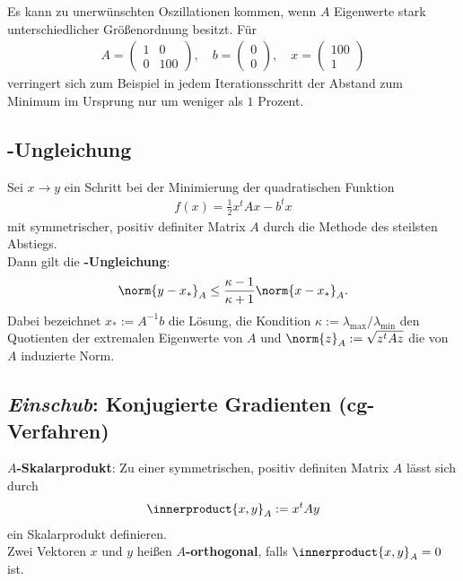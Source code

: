 Es kann zu unerwünschten Oszillationen kommen, wenn $A$ Eigenwerte stark
unterschiedlicher Größenordnung besitzt.
Für
\begin{align*}
    A = \begin{pmatrix}1 & 0\\0 & 100\end{pmatrix}, \quad
    b = \begin{pmatrix}0\\0\end{pmatrix}, \quad
    x = \begin{pmatrix}100\\1\end{pmatrix}
\end{align*}
verringert sich zum Beispiel in jedem Iterationsschritt der Abstand zum Minimum
im Ursprung nur um weniger als $1$ Prozent.

\subsection{%
    -Ungleichung%
}

Sei $x \rightarrow y$ ein Schritt bei der Minimierung der quadratischen
Funktion
\begin{align*}
    f(x) = \frac{1}{2} x^t A x - b^t x
\end{align*}
mit symmetrischer, positiv definiter Matrix $A$ durch die Methode des steilsten
Abstiegs. \\
Dann gilt die \textbf{-Ungleichung}:
\begin{align*}
    \norm{y - x_\ast}_A \le \frac{\kappa - 1}{\kappa + 1} \norm{x - x_\ast}_A.
\end{align*}
Dabei bezeichnet $x_\ast := A^{-1} b$ die Lösung, die Kondition
$\kappa := \lambda_{\max} / \lambda_{\min}$ den Quotienten der extremalen
Eigenwerte von $A$ und $\norm{z}_A := \sqrt{z^t A z}$ die von $A$ induzierte
Norm.

\subsection{%
    \emph{Einschub}: Konjugierte Gradienten (cg-Verfahren)%
}

\textbf{$A$-Skalarprodukt}:
Zu einer symmetrischen, positiv definiten Matrix $A$ lässt sich durch
\begin{align*}
    \innerproduct{x, y}_A := x^t A y
\end{align*}
ein Skalarprodukt definieren. \\
Zwei Vektoren $x$ und $y$ heißen \textbf{$A$-orthogonal}, falls
$\innerproduct{x, y}_A = 0$ ist.

